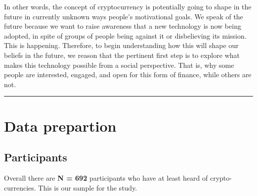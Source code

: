 \documentclass[doc]{apa7}
\begin{document}
In other words, the concept of cryptocurrency is potentially going to
shape in the future in currently unknown ways people's motivational
goals. We speak of the future because we want to raise awareness that a
new technology is now being adopted, in spite of groups of people being
against it or disbelieving its mission. This is happening. Therefore, to
begin understanding how this will shape our beliefs in the future, we
reason that the pertinent first step is to explore what makes this
technology possible from a social perspective. That is, why some people
are interested, engaged, and open for this form of finance, while others
are not.

\begin{center}\rule{0.5\linewidth}{0.5pt}\end{center}

\hypertarget{data-prepartion}{%
\section{Data prepartion}\label{data-prepartion}}

\hypertarget{participants}{%
\subsection{Participants}\label{participants}}

Overall there are \textbf{N = 692} participants who have at least heard
of crypto-currencies. This is our sample for the study.
\end{document}
